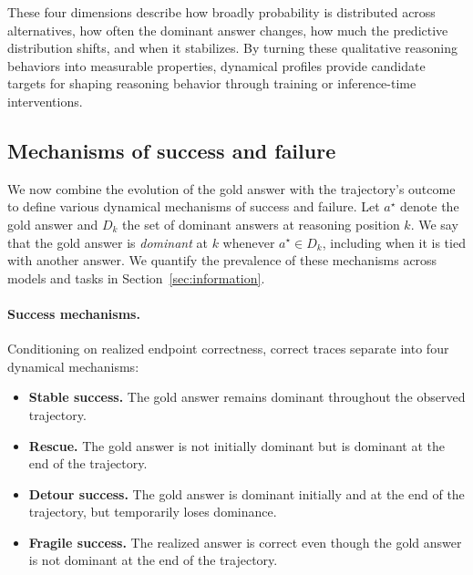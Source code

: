 \documentclass{article}
\begin{document}
These four dimensions describe how broadly probability is distributed across alternatives, how often the dominant answer changes, how much the predictive distribution shifts, and when it stabilizes. By turning these qualitative reasoning behaviors into measurable properties, dynamical profiles provide candidate targets for shaping reasoning behavior through training or inference-time interventions.

\subsection{Mechanisms of success and failure} 
\label{sec:success-failure-mechanisms} 

We now combine the evolution of the gold answer with the trajectory's outcome to define various dynamical mechanisms of success and failure. Let \(a^\star\) denote the gold answer and \(D_k\) the set of dominant answers at reasoning position \(k\). We say that the gold answer is \emph{dominant} at \(k\) whenever \(a^\star \in D_k\), including when it is tied with another answer. We quantify the prevalence of these mechanisms across models and tasks in Section~\ref{sec:information}.

\paragraph{Success mechanisms.} Conditioning on realized endpoint correctness, correct traces separate into four dynamical mechanisms:
\begin{itemize}
    \item \textbf{Stable success.} The gold answer remains dominant throughout the observed trajectory.
    \item \textbf{Rescue.} The gold answer is not initially dominant but is dominant at the end of the trajectory.
    \item \textbf{Detour success.} The gold answer is dominant initially and at the end of the trajectory, but temporarily loses dominance.
    \item \textbf{Fragile success.} The realized answer is correct even though the gold answer is not dominant at the end of the trajectory.
\end{itemize}
\end{document}
